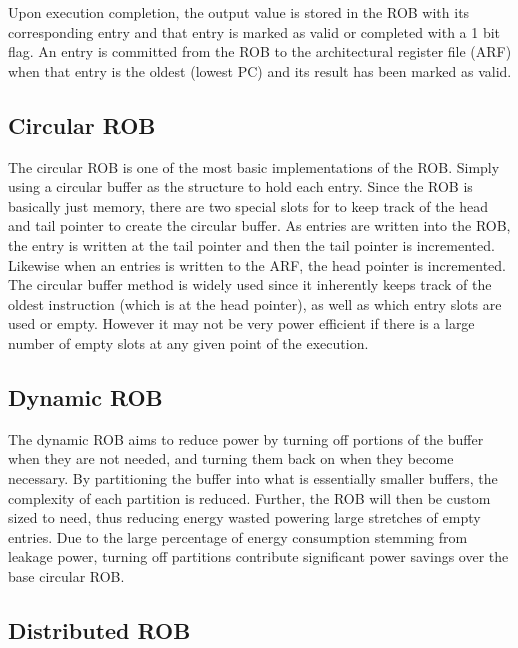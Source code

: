 \documentclass{acm_proc_article-sp}
\begin{document}
Upon execution completion, the output value is stored in the ROB with its 
corresponding entry and that entry is marked as valid or completed with a 
1 bit flag.  An entry is committed from the ROB to the architectural register
file (ARF) when that entry is the oldest (lowest PC) and its result has been 
marked as valid. 
\subsection{Circular ROB}
The circular ROB is one of the most basic implementations of the ROB.  Simply using
a circular buffer as the structure to hold each entry.  Since the ROB is basically
just memory, there are two special slots for to keep track of the head and tail
pointer to create the circular buffer.  As entries are written into the ROB, the
entry is written at the tail pointer and then the tail pointer is incremented.
Likewise when an entries is written to the ARF, the head pointer is incremented.
The circular buffer method is widely used since it inherently keeps track of the 
oldest instruction (which is at the head pointer), as well as which entry slots
are used or empty.   However it may not be very power efficient if there is a large
number of empty slots at any given point of the execution.    
\subsection{Dynamic ROB}
The dynamic ROB aims to reduce power by turning off portions of the buffer when they
are not needed, and turning them back on when they become necessary. By partitioning
the buffer into what is essentially smaller buffers, the complexity of each partition
is reduced. Further, the ROB will then be custom sized to need, thus reducing energy
wasted powering large stretches of empty entries. Due to the large percentage of energy
consumption stemming from leakage power, turning off partitions contribute significant
power savings over the base circular ROB.

\subsection{Distributed ROB}
\end{document}
